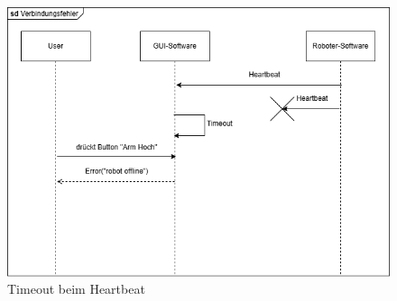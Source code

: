 \begin{figure}[h]  
    \centering
    \includegraphics[width=0.8\linewidth]{diagrams/Verbindungsabbruch.png}
    \caption{Timeout beim Heartbeat}
    \label{fig:Fehlerfall}
\end{figure}



